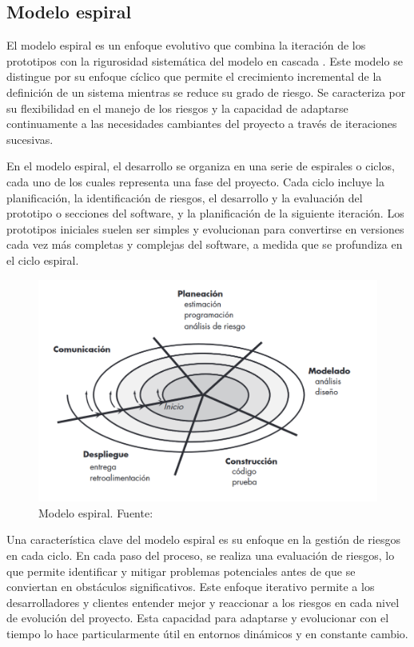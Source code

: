 \subsection{Modelo espiral}

El modelo espiral es un enfoque evolutivo que combina la iteración de los prototipos con la rigurosidad sistemática del modelo en cascada \cite{pressman2010ingeneria}. Este modelo se distingue por su enfoque cíclico que permite el crecimiento incremental de la definición de un sistema mientras se reduce su grado de riesgo. Se caracteriza por su flexibilidad en el manejo de los riesgos y la capacidad de adaptarse continuamente a las necesidades cambiantes del proyecto a través de iteraciones sucesivas.

En el modelo espiral, el desarrollo se organiza en una serie de espirales o ciclos, cada uno de los cuales representa una fase del proyecto. Cada ciclo incluye la planificación, la identificación de riesgos, el desarrollo y la evaluación del prototipo o secciones del software, y la planificación de la siguiente iteración. Los prototipos iniciales suelen ser simples y evolucionan para convertirse en versiones cada vez más completas y complejas del software, a medida que se profundiza en el ciclo espiral.

\begin{figure}[h]
	\centering
	\includegraphics[width=\linewidth]{Figures/model-spiral.png}
	\caption{Modelo espiral. Fuente: \cite{pressman2010ingeneria}}
\end{figure}

Una característica clave del modelo espiral es su enfoque en la gestión de riesgos en cada ciclo. En cada paso del proceso, se realiza una evaluación de riesgos, lo que permite identificar y mitigar problemas potenciales antes de que se conviertan en obstáculos significativos. Este enfoque iterativo permite a los desarrolladores y clientes entender mejor y reaccionar a los riesgos en cada nivel de evolución del proyecto. Esta capacidad para adaptarse y evolucionar con el tiempo lo hace particularmente útil en entornos dinámicos y en constante cambio.

